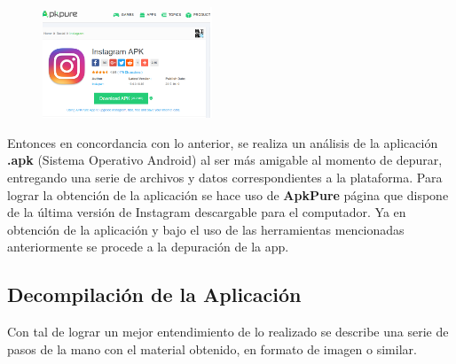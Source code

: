 \documentclass[a4paper,11pt]{article}
\theoremstyle{mytheor}
\begin{document}
\begin{figure} 
\vspace{2pt}
  \begin{center}
    \includegraphics[width=0.45\textwidth]{apkpure.png}
    \label{fig:databaseUserTable}
  \end{center}
  \vspace{1pt}
\end{figure} 
Entonces en concordancia con lo anterior, se realiza un análisis de la aplicación \textbf{.apk} (Sistema Operativo Android) al ser más amigable al momento de depurar, entregando una serie de archivos y datos correspondientes a la plataforma. Para lograr la obtención de la aplicación se hace uso de \textbf{ApkPure} página que dispone de la última versión de Instagram descargable para el computador. 
Ya en obtención de la aplicación y bajo el uso de las herramientas mencionadas anteriormente se procede a la depuración de la app.\\



\subsection{Decompilación de la Aplicación}
Con tal de lograr un mejor entendimiento de lo realizado se describe una serie de pasos de la mano con el material obtenido, en formato de imagen o similar.
\end{document}
